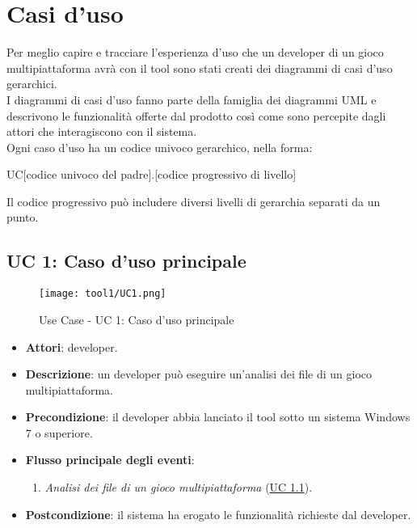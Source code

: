 \section{Casi d'uso}

	Per meglio capire e tracciare l'esperienza d'uso che un developer di un gioco multipiattaforma avrà con il tool sono stati creati dei diagrammi di casi d'uso gerarchici.\\
	I diagrammi di casi d'uso fanno parte della famiglia dei diagrammi UML e descrivono le funzionalità offerte dal prodotto così come sono percepite dagli attori che interagiscono con il sistema.\\
	Ogni caso d'uso ha un codice univoco gerarchico, nella forma:
	\begin{center} 
		UC[codice univoco del padre].[codice progressivo di livello]
	\end{center}
	\paragrafo Il codice progressivo può includere diversi livelli di gerarchia separati da un punto.
	
	\subsection{UC 1: Caso d'uso principale}
		\label{subsec:UC1}
	
		\begin{figure}[!h] 
			\centering 
			\texttt{[image: tool1/UC1.png]} 
			\caption{Use Case - UC 1: Caso d'uso principale}
		\end{figure}
		
		\begin{itemize}
			\item\textbf{Attori}: developer.
			\item\textbf{Descrizione}: un developer può eseguire un'analisi dei file di un gioco multipiattaforma.
			\item\textbf{Precondizione}: il developer abbia lanciato il tool sotto un sistema Windows 7 o superiore.
			\item\textbf{Flusso principale degli eventi}: 
			\begin{enumerate}
				\item\textit{Analisi dei file di un gioco multipiattaforma} (\hyperref[subsec:UC1.1]{UC 1.1}).
			\end{enumerate}
			\item\textbf{Postcondizione}: il sistema ha erogato le funzionalità richieste dal developer.
		\end{itemize}
		
